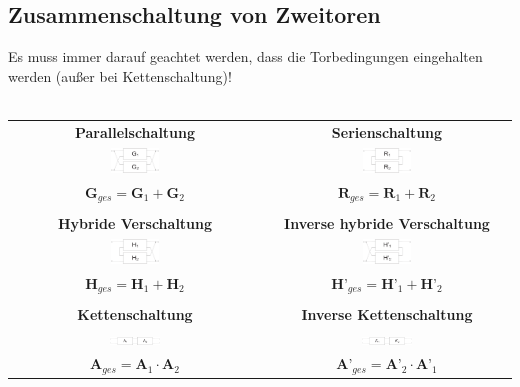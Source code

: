 \documentclass[a4paper,twocolumn,10pt]{article}
\begin{document}
\subsection*{Zusammenschaltung von Zweitoren}
Es muss immer darauf geachtet werden, dass die Torbedingungen eingehalten werden (außer bei Kettenschaltung)!\\\\

\begin{tabular}{c|c}
	\textbf{Parallelschaltung} & \textbf{Serienschaltung}\\
	\includegraphics[width=0.2\textwidth]{img/Zweitor_Parallel} & \includegraphics[width=0.2\textwidth]{img/Zweitor_Seriell} \\
	$\textbf{G}_{ges}=\textbf{G}_1+\textbf{G}_2$ & $\textbf{R}_{ges}=\textbf{R}_1+\textbf{R}_2$
\\&\\
	\textbf{Hybride Verschaltung} & \textbf{Inverse hybride Verschaltung}\\
	\includegraphics[width=0.2\textwidth]{img/Zweitor_Hybrid} & \includegraphics[width=0.2\textwidth]{img/Zweitor_inversHybrid} \\
	$\textbf{H}_{ges}=\textbf{H}_1+\textbf{H}_2$ & $\textbf{H'}_{ges}=\textbf{H'}_1+\textbf{H'}_2$
\\&\\
	\textbf{Kettenschaltung} & \textbf{Inverse Kettenschaltung}\\
	\includegraphics[width=0.21\textwidth, keepaspectratio]{img/Zweitor_Kette} &
	\includegraphics[width=0.21\textwidth]{img/Zweitor_inversKette}\\
	$\textbf{A}_{ges}=\textbf{A}_1\cdot \textbf{A}_2$ &
	$\textbf{A'}_{ges}=\textbf{A'}_2\cdot \textbf{A'}_1$
\end{tabular}
\end{document}
